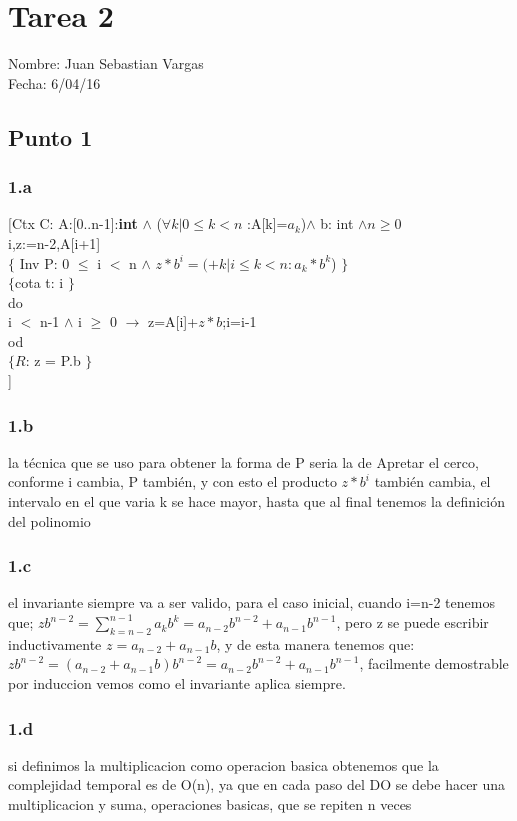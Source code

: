 \documentclass{article}
\newcommand\tab[1][1cm]{\hspace*{#1}}
\begin{document}
\section*{Tarea 2}
Nombre: Juan Sebastian Vargas\\
Fecha: 6/04/16

\subsection*{Punto 1}
\subsubsection*{1.a}
[Ctx C: A:[0..n-1]:\textbf{int} $\wedge$ ($\forall k | 0\leq k < n$ :A[k]=$a_k$)$\wedge$ b: int $\wedge n \geq 0$ \\
i,z:=n-2,A[i+1]\\
$\{$ Inv P: 0 $\leq$ i $<$ n $\wedge$ $z*b^i = (+k | i \leq k < n : a_k*b^k$) $\}$\\
$\{$cota t: i $\}$\\ 
do \\
\tab i $<$ n-1 $\wedge$ i $\geq$ 0 $\rightarrow$ z=A[i]+$z*b$;i=i-1\\
od\\
$\{R$: z = P.b $\}$\\
]
\subsubsection*{1.b}
la técnica que se uso para obtener la forma de P seria la de 
Apretar el cerco, conforme i cambia, P también, y con esto el producto $z*b^i$ también cambia, el intervalo en el que varia k se hace mayor, hasta que al final tenemos la definición del polinomio 
\subsubsection*{1.c}
el invariante siempre va a ser valido, para el caso inicial, cuando i=n-2 tenemos que;
$zb^{n-2}=\sum_{k=n-2}^{n-1} a_kb^k=a_{n-2}b^{n-2}+a_{n-1}b^{n-1}$, pero z se puede escribir inductivamente $z=a_{n-2}+a_{n-1}b$, y de esta manera tenemos que: 
$zb^{n-2}=(a_{n-2}+a_{n-1}b)b^{n-2}=a_{n-2}b^{n-2}+a_{n-1}b^{n-1}$, facilmente demostrable por induccion vemos como el invariante aplica siempre.
\subsubsection*{1.d}
si definimos la multiplicacion como operacion basica obtenemos que la complejidad temporal es de O(n), ya que en cada paso del DO se debe hacer una multiplicacion y suma, operaciones basicas, que se repiten n veces
\end{document}
